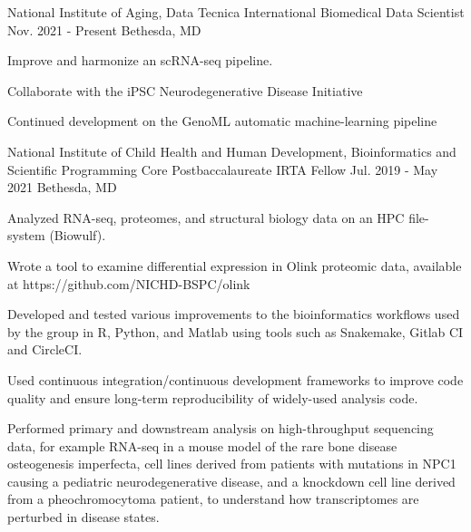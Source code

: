 \begin{cventries}
  \cventry
 {National Institute of Aging, Data Tecnica International}
 {Biomedical Data Scientist}
 {Nov. 2021 - Present}
 {Bethesda, MD}
 	{
		\begin{cvitems}
		    \item {Improve and harmonize an scRNA-seq pipeline.}
		    \item {Collaborate with the iPSC Neurodegenerative Disease Initiative}
		    \item {Continued development on the GenoML automatic machine-learning pipeline}
        \end{cvitems}
 	}
 \cventry
 {National Institute of Child Health and Human Development, Bioinformatics and Scientific Programming Core}
 {Postbaccalaureate IRTA Fellow}
 {Jul. 2019 - May 2021}
 {Bethesda, MD}
 	{
		\begin{cvitems}
		    \item {Analyzed RNA-seq, proteomes, and structural biology data on an HPC file-system (Biowulf).}
		    \item {Wrote a tool to examine differential expression in Olink proteomic data, available at https://github.com/NICHD-BSPC/olink}
		    \item {Developed and tested various improvements to the bioinformatics workflows used by the group in R, Python, and Matlab using tools such as Snakemake, Gitlab CI and CircleCI.}
        	\item {Used continuous integration/continuous development frameworks to improve code quality and ensure long-term reproducibility of widely-used analysis code.}
        	\item {Performed primary and downstream analysis on high-throughput sequencing data, for example RNA-seq in a mouse model of the rare bone disease osteogenesis imperfecta, cell lines derived from patients with mutations in NPC1 causing a pediatric neurodegenerative disease, and a knockdown cell line derived from a pheochromocytoma patient, to understand how transcriptomes are perturbed in disease states.}
        \end{cvitems}
}
\end{cventries}

